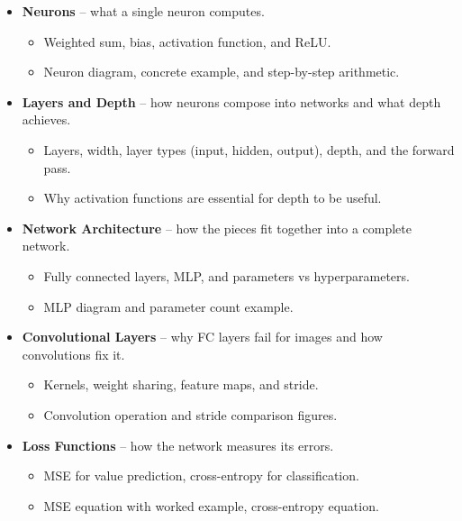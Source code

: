 \documentclass[11pt]{article}
\begin{document}
\begin{itemize}
\item \textbf{Neurons} -- what a single neuron computes.
  \begin{itemize}[label=$\circ$, itemsep=0.2em, parsep=0pt, topsep=0pt, partopsep=0pt]
  \item Weighted sum, bias, activation function, and ReLU.
  \item Neuron diagram, concrete example, and step-by-step
    arithmetic.
  \end{itemize}
\item \textbf{Layers and Depth} -- how neurons compose into
  networks and what depth achieves.
  \begin{itemize}[label=$\circ$, itemsep=0.2em, parsep=0pt, topsep=0pt, partopsep=0pt]
  \item Layers, width, layer types (input, hidden, output), depth,
    and the forward pass.
  \item Why activation functions are essential for depth to be
    useful.
  \end{itemize}
\item \textbf{Network Architecture} -- how the pieces fit together
  into a complete network.
  \begin{itemize}[label=$\circ$, itemsep=0.2em, parsep=0pt, topsep=0pt, partopsep=0pt]
  \item Fully connected layers, MLP, and parameters vs
    hyperparameters.
  \item MLP diagram and parameter count example.
  \end{itemize}
\item \textbf{Convolutional Layers} -- why FC layers fail for
  images and how convolutions fix it.
  \begin{itemize}[label=$\circ$, itemsep=0.2em, parsep=0pt, topsep=0pt, partopsep=0pt]
  \item Kernels, weight sharing, feature maps, and stride.
  \item Convolution operation and stride comparison figures.
  \end{itemize}
\item \textbf{Loss Functions} -- how the network measures its
  errors.
  \begin{itemize}[label=$\circ$, itemsep=0.2em, parsep=0pt, topsep=0pt, partopsep=0pt]
  \item MSE for value prediction, cross-entropy for classification.
  \item MSE equation with worked example, cross-entropy equation.

\end{itemize}
\end{itemize}
\end{document}
